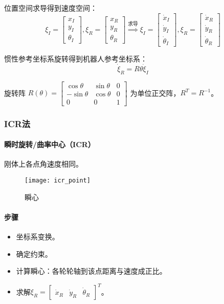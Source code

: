 \documentclass[
12pt, %
a4paper, 
oneside, %
headinclude,footinclude, %
]{scrartcl}
\begin{document}
位置空间求导得到速度空间：
$$
\xi_I = \begin{bmatrix} x_I \\ y_I \\ \theta_I \end{bmatrix}, 
\xi_R = \begin{bmatrix} x_R \\ y_R \\ \theta_R \end{bmatrix}
\overset{\text{求导}}{\Longrightarrow}
\xi_I = \begin{bmatrix} \dot{x}_I \\ \dot{y}_I \\ \dot{\theta}_I \end{bmatrix},
\xi_R = \begin{bmatrix} \dot{x}_R \\ \dot{y}_R \\ \dot{\theta}_R \end{bmatrix}
$$

惯性参考坐标系旋转得到机器人参考坐标系：
$$
\dot{\xi}_R = R\theta \dot{\xi}_I
$$

旋转阵
$ R(\theta) = \begin{bmatrix} \cos\theta & \sin\theta & 0 \\ -\sin\theta & \cos\theta & 0 \\ 0 & 0 & 1 \end{bmatrix} $
为单位正交阵，$ R^T = R^{-1} $。
\subsubsection{ICR法}
\paragraph{瞬时旋转/曲率中心（ICR）}
刚体上各点角速度相同。
\begin{figure}[H]
\centering 
\texttt{[image: icr\_point]} 
\caption[瞬心]{瞬心}
\end{figure}
\paragraph{步骤}
\begin{itemize}
\item 坐标系变换。
\item 确定约束。
\item 计算瞬心：各轮轮轴到该点距离与速度成正比。
\item 求解$ \xi_R = \begin{bmatrix} \dot{x}_R & \dot{y}_R & \dot{\theta}_R \end{bmatrix}^T $。
\end{itemize}
\end{document}
